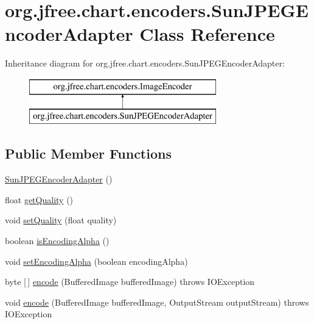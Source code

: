\hypertarget{classorg_1_1jfree_1_1chart_1_1encoders_1_1_sun_j_p_e_g_encoder_adapter}{}\section{org.\+jfree.\+chart.\+encoders.\+Sun\+J\+P\+E\+G\+Encoder\+Adapter Class Reference}
\label{classorg_1_1jfree_1_1chart_1_1encoders_1_1_sun_j_p_e_g_encoder_adapter}
Inheritance diagram for org.\+jfree.\+chart.\+encoders.\+Sun\+J\+P\+E\+G\+Encoder\+Adapter\+:\begin{figure}[H]
\begin{center}
\leavevmode
\includegraphics[height=2.000000cm]{classorg_1_1jfree_1_1chart_1_1encoders_1_1_sun_j_p_e_g_encoder_adapter}
\end{center}
\end{figure}
\subsection*{Public Member Functions}
\begin{DoxyCompactItemize}
\item 
\mbox{\hyperlink{classorg_1_1jfree_1_1chart_1_1encoders_1_1_sun_j_p_e_g_encoder_adapter_af486d2a169c52daa46b117e94f39e8aa}{Sun\+J\+P\+E\+G\+Encoder\+Adapter}} ()
\item 
float \mbox{\hyperlink{classorg_1_1jfree_1_1chart_1_1encoders_1_1_sun_j_p_e_g_encoder_adapter_af9230d0123dd8788669b558a94bb3c03}{get\+Quality}} ()
\item 
void \mbox{\hyperlink{classorg_1_1jfree_1_1chart_1_1encoders_1_1_sun_j_p_e_g_encoder_adapter_a00787c98635f7300875c0246d8403712}{set\+Quality}} (float quality)
\item 
boolean \mbox{\hyperlink{classorg_1_1jfree_1_1chart_1_1encoders_1_1_sun_j_p_e_g_encoder_adapter_a1d9fb1cf5b9a4c0db2ed038a83fd4355}{is\+Encoding\+Alpha}} ()
\item 
void \mbox{\hyperlink{classorg_1_1jfree_1_1chart_1_1encoders_1_1_sun_j_p_e_g_encoder_adapter_ad41ef8a4ba5d9044dc3f1ac656c43504}{set\+Encoding\+Alpha}} (boolean encoding\+Alpha)
\item 
byte \mbox{[}$\,$\mbox{]} \mbox{\hyperlink{classorg_1_1jfree_1_1chart_1_1encoders_1_1_sun_j_p_e_g_encoder_adapter_aee7539bd600fe8bedef71c22dc36884c}{encode}} (Buffered\+Image buffered\+Image)  throws I\+O\+Exception 
\item 
void \mbox{\hyperlink{classorg_1_1jfree_1_1chart_1_1encoders_1_1_sun_j_p_e_g_encoder_adapter_a04af4aa9592b9b63934742a6fce74fcd}{encode}} (Buffered\+Image buffered\+Image, Output\+Stream output\+Stream)  throws I\+O\+Exception 
\end{DoxyCompactItemize}


